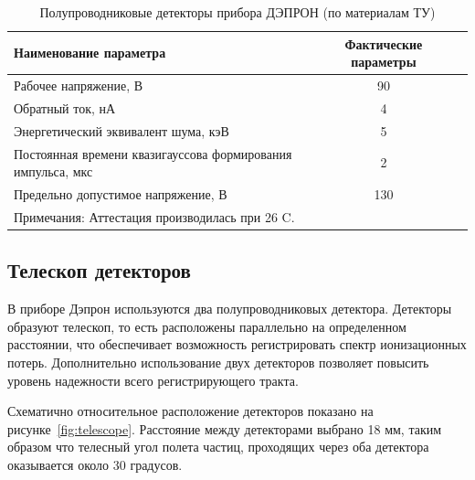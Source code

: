 \begin{table} 

	\begin{tabular}{p{10cm}|cc}
		Наименование параметра&Фактические параметры\\ \hline
		Рабочее напряжение, В&90&\\ Обратный ток, нА&4\\
		Энергетический эквивалент шума, кэВ&5\\
		Постоянная времени квазигауссова формирования импульса, мкс&2\\
		Предельно допустимое напряжение, В&130\\
		\multicolumn{2}{l}{Примечания: Аттестация производилась при 26 C.}\\
		
	\end{tabular} 
	\caption{Полупроводниковые детекторы прибора ДЭПРОН (по материалам ТУ)}
		\label{tab:detectors}
\end{table}



\subsection{Телескоп детекторов}
В приборе Дэпрон  используются два полупроводниковых детектора. Детекторы образуют телескоп, то есть расположены параллельно на определенном расстоянии, что обеспечивает возможность регистрировать спектр ионизационных потерь.
Дополнительно использование двух детекторов позволяет повысить уровень надежности всего регистрирующего тракта.

Схематично относительное расположение детекторов показано на рисунке~\ref{fig:telescope}.  Расстояние между детекторами выбрано 18 мм, таким образом что телесный угол полета частиц, проходящих через оба детектора оказывается около 30 градусов. 





